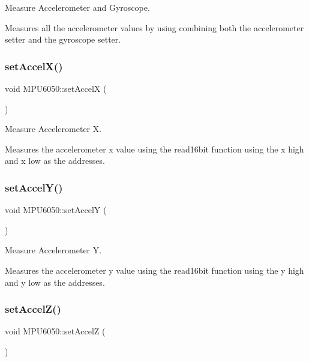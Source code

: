 Measure Accelerometer and Gyroscope. 

Measures all the accelerometer values by using combining both the accelerometer setter and the gyroscope setter. \mbox{\label{class_m_p_u6050_a99382dd9d3e36f575a020d6f5ee0631a}} 
\subsubsection{\texorpdfstring{set\+Accel\+X()}{setAccelX()}}
{\footnotesize\ttfamily void M\+P\+U6050\+::set\+AccelX (\begin{DoxyParamCaption}{ }\end{DoxyParamCaption})}



Measure Accelerometer X. 

Measures the accelerometer x value using the read16bit function using the x high and x low as the addresses. \mbox{\label{class_m_p_u6050_ab2a793e509a772f3e67990194b774688}} 
\subsubsection{\texorpdfstring{set\+Accel\+Y()}{setAccelY()}}
{\footnotesize\ttfamily void M\+P\+U6050\+::set\+AccelY (\begin{DoxyParamCaption}{ }\end{DoxyParamCaption})}



Measure Accelerometer Y. 

Measures the accelerometer y value using the read16bit function using the y high and y low as the addresses. \mbox{\label{class_m_p_u6050_aee6033621345411ef54bca39bdcb7b19}} 
\subsubsection{\texorpdfstring{set\+Accel\+Z()}{setAccelZ()}}
{\footnotesize\ttfamily void M\+P\+U6050\+::set\+AccelZ (\begin{DoxyParamCaption}{ }\end{DoxyParamCaption})}



